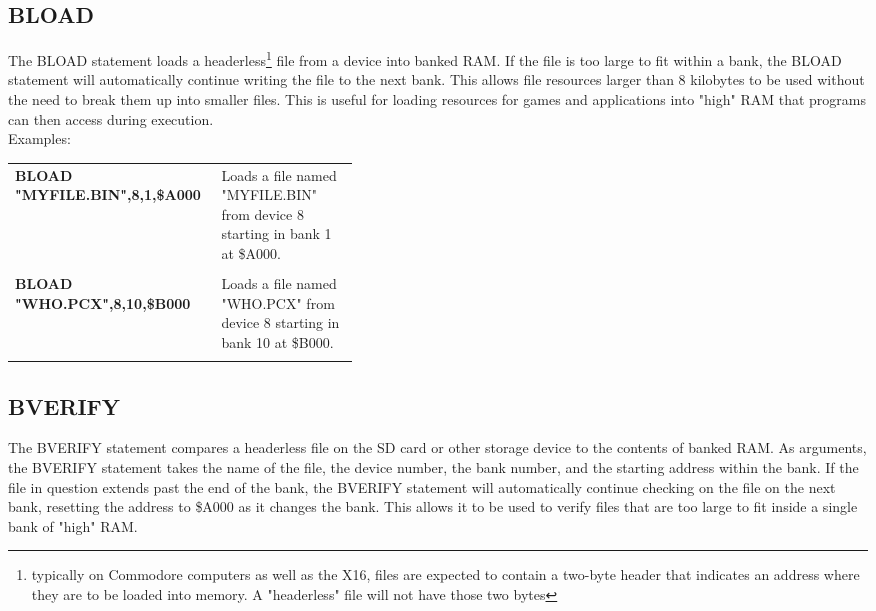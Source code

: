 \subsection{BLOAD}

The {\ttfamily BLOAD} statement loads a headerless\footnote{typically on
Commodore computers as well as the X16, files are expected to contain a
two-byte header that indicates an address where they are to be loaded into
memory.  A "headerless" file will not have those two bytes} file from a device
into banked RAM.  If the file is too large to fit within a bank, the {\ttfamily
BLOAD} statement will automatically continue writing the file to the next bank.
This allows file resources larger than 8 kilobytes to be used without the need
to break them up into smaller files.  This is useful for loading resources for
games and applications into "high" RAM that programs can then access during
execution.\\

Examples:\\

\begin{tabular}{l p{0.4\linewidth}}

	{\ttfamily\bfseries BLOAD "MYFILE.BIN",8,1,\$A000}&Loads a file named
	"MYFILE.BIN" from device 8 starting in bank 1 at \$A000.\\\\

	{\ttfamily\bfseries BLOAD "WHO.PCX",8,10,\$B000}&Loads a file named
	"WHO.PCX" from device 8 starting in bank 10 at \$B000.\\\\

\end{tabular}

\subsection{BVERIFY}

The {\ttfamily BVERIFY} statement compares a headerless file on the SD card or
other storage device to the contents of banked RAM.  As arguments, the
{\ttfamily BVERIFY} statement takes the name of the file, the device number,
the bank number, and the starting address within the bank.  If the file in
question extends past the end of the bank, the {\ttfamily BVERIFY} statement
will automatically continue checking on the file on the next bank, resetting
the address to {\ttfamily \$A000} as it changes the bank.  This allows it to be
used to verify files that are too large to fit inside a single bank of "high"
RAM.\\

